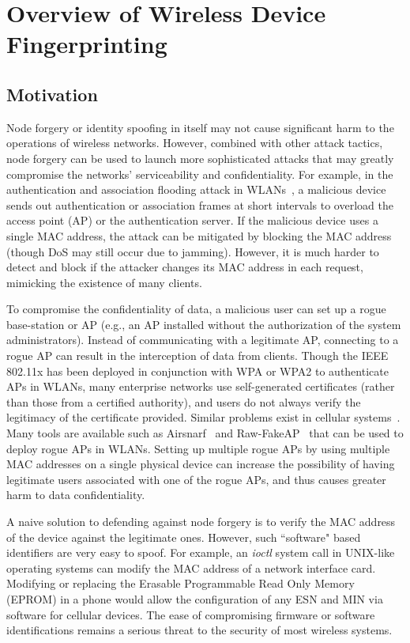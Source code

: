 \documentclass[journal,draftcls,onecolumn,11pt]{IEEEtran}
\begin{document}
\section{Overview of Wireless Device Fingerprinting}
\label{sect:overview}
\subsection{Motivation}
\label{sect:need}

Node forgery or identity spoofing in itself may not cause significant harm to the operations of wireless networks. However, combined with other attack tactics, node forgery can be used to launch more sophisticated attacks that may greatly compromise the networks' serviceability and confidentiality. For example, in the authentication and association flooding attack in WLANs~\cite{liu2006analysis}, a malicious device sends out authentication or association frames at short intervals to overload the access point (AP) or the authentication server.  If the malicious device uses a single MAC address, the attack can be mitigated by blocking the MAC address (though DoS may still occur due to jamming). However, it is much harder to detect and block if the attacker changes its MAC address in each request, mimicking the existence of many clients.

To compromise the confidentiality of data, a malicious user can set up a rogue base-station or AP (e.g., an AP  installed without the authorization of the system administrators). Instead of communicating with a legitimate AP, connecting to a rogue AP can result in the interception of data from clients.  Though the IEEE 802.11x has been deployed in conjunction with WPA or WPA2 to authenticate APs in WLANs, many enterprise networks use self-generated certificates (rather than those from a certified authority), and users do not always verify the legitimacy of the certificate provided. Similar problems exist in cellular systems~\cite{Barbeau}. Many tools are available such as Airsnarf~\cite{Airsnarf} and Raw-FakeAP~\cite{RawFake} that can be used to deploy rogue APs in WLANs.  Setting up multiple rogue APs by using multiple MAC addresses on a single physical device can increase the possibility of having legitimate users associated with one of the rogue APs, and thus causes greater harm to data confidentiality.

A naive solution to defending against node forgery is to verify the MAC address of the device against the legitimate ones. However, such ``software" based identifiers are very easy to spoof. For example, an \textit{ioctl} system call in UNIX-like operating systems can modify the MAC address of a network interface card. Modifying or replacing the Erasable Programmable Read Only Memory (EPROM) in a phone would allow the configuration of any ESN and MIN via software for cellular devices. The ease of compromising firmware or software identifications remains a serious threat to the security of most wireless systems.
\end{document}
